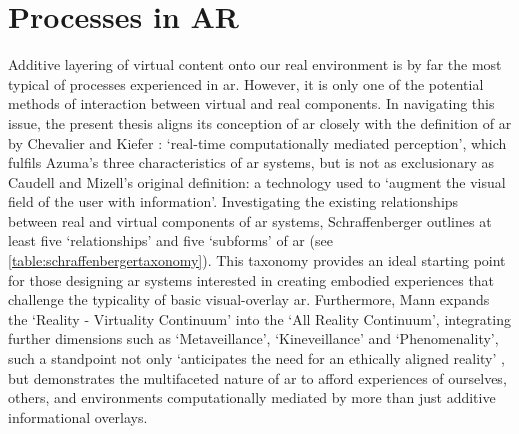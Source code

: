 \section{Processes in AR}\label{sec: ar-process}
Additive layering of virtual content onto our real environment is by far the most typical of processes experienced in \gls{ar}. However, it is only one of the potential methods of interaction between virtual and real components. In navigating this issue, the present thesis aligns its conception of \gls{ar} closely with the definition of \gls{ar} by Chevalier and Kiefer \citeyearpar{chevalier2020}: `real-time computationally mediated perception', which fulfils Azuma's three characteristics of \gls{ar} systems, but is not as exclusionary as Caudell and Mizell's original definition: a technology used to  `augment the visual field of the user with information'. Investigating the existing relationships between real and virtual components of \gls{ar} systems, Schraffenberger outlines at least five `relationships' and five `subforms' of \gls{ar} (see \autoref{table:schraffenbergertaxonomy}). This taxonomy \citeyearpar[pp. 80-130]{schraffenberger2018} provides an ideal starting point for those designing \gls{ar} systems interested in creating embodied experiences that challenge the typicality of basic visual-overlay \gls{ar}. Furthermore, Mann expands the `Reality - Virtuality Continuum' \citep{milgram1994} into the `All Reality Continuum', integrating further dimensions such as `Metaveillance', `Kineveillance' and `Phenomenality', such a standpoint not only `anticipates the need for an ethically aligned reality' \citeyearpar{mann2018}, but demonstrates the multifaceted nature of \gls{ar} to afford experiences of ourselves, others, and environments computationally mediated by more than just additive informational overlays.

